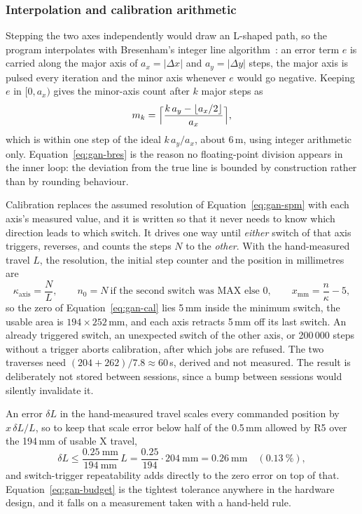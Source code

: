 \subsubsection{Interpolation and calibration arithmetic}

Stepping the two axes independently would draw an L-shaped path, so the program interpolates with Bresenham's integer line algorithm~\cite[p.~28]{bresenham1965}: an error term $e$ is carried along the major axis of $a_x=|\Delta x|$ and $a_y=|\Delta y|$ steps, the major axis is pulsed every iteration and the minor axis whenever $e$ would go negative.
Keeping $e$ in $[0,a_x)$ gives the minor-axis count after $k$ major steps as
\begin{equation}
m_k=\Bigl\lceil\frac{k\,a_y-\lfloor a_x/2\rfloor}{a_x}\Bigr\rceil,
\label{eq:gan-bres}
\end{equation}
which is within one step of the ideal $k\,a_y/a_x$, about 6\,\textmu m, using integer arithmetic only.
Equation~\ref{eq:gan-bres} is the reason no floating-point division appears in the inner loop: the deviation from the true line is bounded by construction rather than by rounding behaviour.

Calibration replaces the assumed resolution of Equation~\ref{eq:gan-spm} with each axis's measured value, and it is written so that it never needs to know which direction leads to which switch.
It drives one way until \emph{either} switch of that axis triggers, reverses, and counts the steps $N$ to the \emph{other}.
With the hand-measured travel $L$, the resolution, the initial step counter and the position in millimetres are
\begin{equation}
\kappa_{\mathrm{axis}}=\frac{N}{L},\qquad n_0=N\ \text{if the second switch was MAX else }0,\qquad x_{\mathrm{mm}}=\frac{n}{\kappa}-5,
\label{eq:gan-cal}
\end{equation}
so the zero of Equation~\ref{eq:gan-cal} lies 5\,mm inside the minimum switch, the usable area is $194\times252$\,mm, and each axis retracts 5\,mm off its last switch.
An already triggered switch, an unexpected switch of the other axis, or 200\,000 steps without a trigger aborts calibration, after which jobs are refused.
The two traverses need $(204+262)/7.8\approx60$\,s, derived and not measured.
The result is deliberately not stored between sessions, since a bump between sessions would silently invalidate it.

An error $\delta L$ in the hand-measured travel scales every commanded position by $x\,\delta L/L$, so to keep that scale error below half of the 0.5\,mm allowed by R5 over the 194\,mm of usable X travel,
\begin{equation}
\delta L\le\frac{0.25\ \mathrm{mm}}{194\ \mathrm{mm}}\,L=\frac{0.25}{194}\cdot204\ \mathrm{mm}=0.26\ \mathrm{mm}\quad(0.13\ \%),
\label{eq:gan-budget}
\end{equation}
and switch-trigger repeatability adds directly to the zero error on top of that.
Equation~\ref{eq:gan-budget} is the tightest tolerance anywhere in the hardware design, and it falls on a measurement taken with a hand-held rule.

